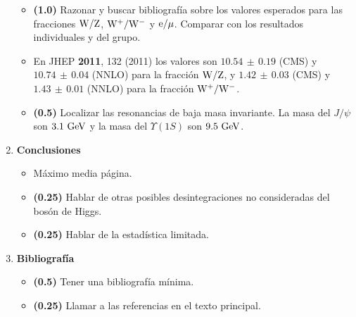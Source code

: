 \documentclass[11pt]{articulo}
\begin{document}
\begin{enumerate}
\begin{itemize}
\item {\bf (1.0)} Razonar y buscar bibliograf\'ia sobre los valores esperados para las fracciones ${\rm W/Z}$, ${\rm W^+/W^-}$ y ${\rm e/\mu}$. Comparar con los resultados individuales y del grupo.

\item En JHEP {\bf 2011}, 132 (2011) los valores son $10.54\,\pm\,0.19$ (CMS) y $10.74\,\pm\,0.04$ (NNLO) para la fracci\'on ${\rm W/Z}$, y $1.42\,\pm\,0.03$ (CMS) y $1.43\,\pm\,0.01$ (NNLO) para la fracci\'on ${\rm W^+/W^-}$.

\item {\bf (0.5)} Localizar las resonancias de baja masa invariante. La masa del $J/\psi$ son ${\rm 3.1~GeV}$ y la masa del $\Upsilon(1S)$ son ${\rm 9.5~GeV}$.

\end{itemize}

\item {\bf Conclusiones}

\begin{itemize}

\item M\'aximo media p\'agina.

\item {\bf (0.25)} Hablar de otras posibles desintegraciones no consideradas del bos\'on de Higgs.

\item {\bf (0.25)} Hablar de la estad\'istica limitada.

\end{itemize}

\item {\bf Bibliograf\'ia}

\begin{itemize}

\item {\bf (0.5)} Tener una bibliograf\'ia m\'inima.

\item {\bf (0.25)} Llamar a las referencias en el texto principal.

\end{itemize}

\end{enumerate}
\end{document}
